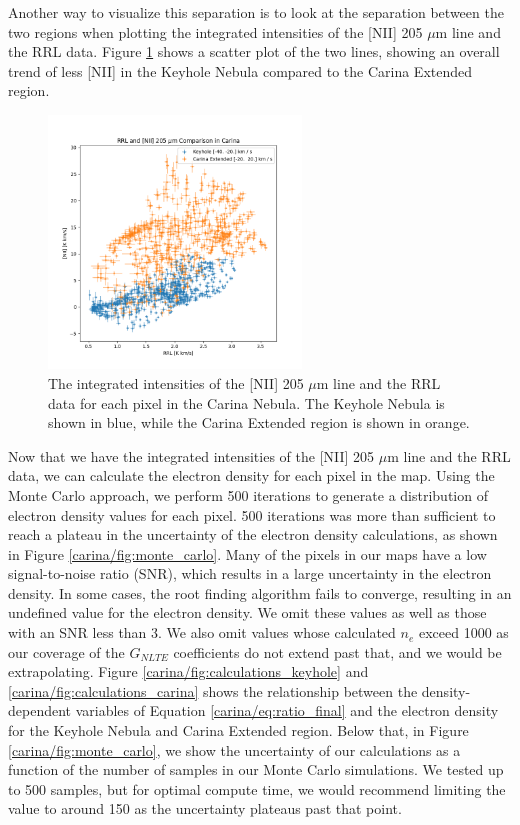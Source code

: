 Another way to visualize this separation is to look at the separation between the two regions when plotting the integrated intensities of the [NII] 205 $\mu$m line and the RRL data.
Figure \ref{carina/fig:intensity_scatter} shows a scatter plot of the two lines, showing an overall trend of less [NII] in the Keyhole Nebula compared to the Carina Extended region.

\begin{figure}
    \centering
    \includegraphics[width=0.6\textwidth]{figs/carina/intensity_scatter.png}
    \caption[Integrated Intensities of {[}NII{]} 205 $\mu$m Line and RRL Data]{
        The integrated intensities of the [NII] 205 $\mu$m line and the RRL data for each pixel in the Carina Nebula.
        The Keyhole Nebula is shown in blue, while the Carina Extended region is shown in orange.
        }
    \label{carina/fig:intensity_scatter}
\end{figure}

Now that we have the integrated intensities of the [NII] 205 $\mu$m line and the RRL data, we can calculate the electron density for each pixel in the map.
Using the Monte Carlo approach, we perform 500 iterations to generate a distribution of electron density values for each pixel.
500 iterations was more than sufficient to reach a plateau in the uncertainty of the electron density calculations, as shown in Figure \ref{carina/fig:monte_carlo}.
Many of the pixels in our maps have a low signal-to-noise ratio (SNR), which results in a large uncertainty in the electron density.
In some cases, the root finding algorithm fails to converge, resulting in an undefined value for the electron density.
We omit these values as well as those with an SNR less than 3.
We also omit values whose calculated $n_e$ exceed 1000 as our coverage of the $G_{NLTE}$ coefficients do not extend past that, and we would be extrapolating. 
Figure \ref{carina/fig:calculations_keyhole} and \ref{carina/fig:calculations_carina} shows the relationship between the density-dependent variables of Equation \ref{carina/eq:ratio_final} and the electron density for the Keyhole Nebula and Carina Extended region.
Below that, in Figure \ref{carina/fig:monte_carlo}, we show the uncertainty of our calculations as a function of the number of samples in our Monte Carlo simulations.
We tested up to 500 samples, but for optimal compute time, we would recommend limiting the value to around 150 as the uncertainty plateaus past that point. 

